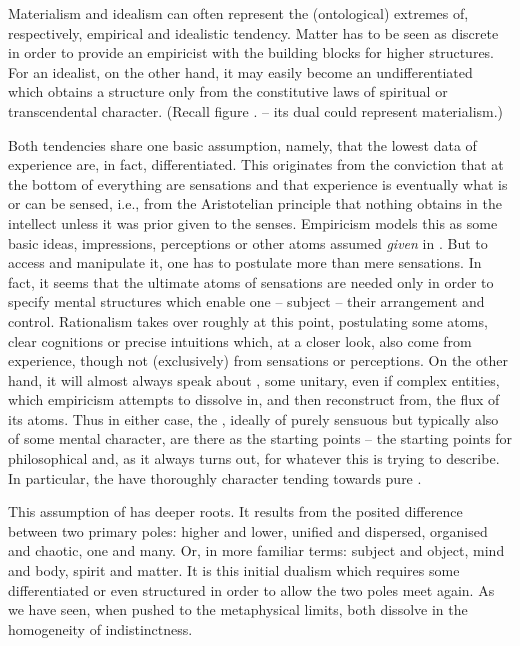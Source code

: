 Materialism and idealism can often represent the (ontological) extremes of,
respectively, empirical and idealistic tendency.  Matter has to be seen as
discrete in order to provide an empiricist with the building blocks for higher
structures.  For an idealist, on the other hand, it may easily become an
undifferentiated  which obtains a structure only from the
constitutive laws of spiritual or transcendental character. (Recall figure
. -- its dual could represent materialism.)

\pa Both tendencies share one basic assumption, namely, that the lowest data of
experience are, in fact, differentiated.  This originates from the conviction
that at the bottom of everything are  sensations and that
experience is eventually what is or can be sensed, i.e., from the Aristotelian
principle that nothing obtains in the intellect unless it was prior given to the
senses.
Empiricism models this as some basic ideas, impressions, perceptions or other
atoms assumed {\em given} in .  But to access and
manipulate it, one has to postulate more than mere sensations. In fact, it seems
that the ultimate atoms of sensations are needed only in order to specify mental
structures which enable one -- subject -- their arrangement and control.
Rationalism takes over roughly at this point, postulating some 
atoms, clear cognitions or precise intuitions which, at a closer look, also come
from experience, though not (exclusively) from sensations or perceptions.  On
the other hand, it will almost always speak about , some
unitary, even if complex entities, which empiricism attempts to dissolve in, and
then reconstruct from, the flux of its atoms.  Thus in either case, the
, ideally of purely sensuous but typically also of some mental
character, are there as the starting points -- the starting points for
philosophical  and, as it always turns out, for whatever this
 is trying to describe.  In particular, the  have
thoroughly  character tending towards pure .

This assumption of  has deeper roots. It results from the posited
difference between two primary poles: higher and lower, unified and dispersed,
organised and chaotic, one and many. Or, in more familiar terms: subject and
object, mind and body, spirit and matter.  It is this initial dualism which
requires some differentiated or even structured  in order to allow
the two  poles meet again.  As we have seen, when pushed to the
metaphysical limits, both dissolve in the homogeneity of indistinctness.

